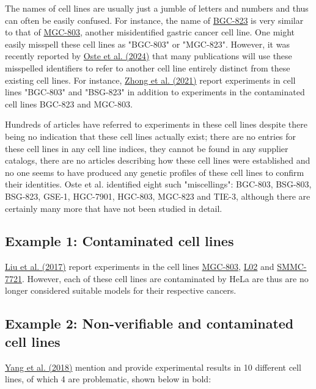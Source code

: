 \documentclass[letterpaper, 12pt]{article}
\begin{document}
The names of cell lines are usually just a jumble of letters and numbers and thus can often be easily confused. For instance, the name of \href{https://www.cellosaurus.org/CVCL_3360}{BGC-823} is very similar to that of \href{https://www.cellosaurus.org/CVCL_5334}{MGC-803}, another misidentified gastric cancer cell line. One might easily misspell these cell lines as "BGC-803" or "MGC-823". However, it was recently reported by \href{https://doi.org/10.1002/ijc.34995}{Oste et al. (2024)} that many publications will use these misspelled identifiers to refer to another cell line entirely distinct from these existing cell lines. For instance, \href{https://doi.org/10.1002/jgm.3330}{Zhong et al. (2021)} report experiments in cell lines "BGC-803" and "BSG-823" in addition to experiments in the contaminated cell lines BGC-823 and MGC-803.

Hundreds of articles have referred to experiments in these cell lines despite there being no indication that these cell lines actually exist; there are no entries for these cell lines in any cell line indices, they cannot be found in any supplier catalogs, there are no articles describing how these cell lines were established and no one seems to have produced any genetic profiles of these cell lines to confirm their identities. Oste et al. identified eight such "miscellings": BGC-803, BSG-803, BSG-823, GSE-1, HGC-7901, HGC-803, MGC-823 and TIE-3, although there are certainly many more that have not been studied in detail.

\subsection*{Example 1: Contaminated cell lines}

\href{https://doi.org/10.1016/j.yexcr.2017.09.005}{Liu et al. (2017)} report experiments in the cell lines \href{https://www.cellosaurus.org/CVCL_5334}{MGC-803}, \href{https://www.cellosaurus.org/CVCL_6926}{L02} and \href{https://www.cellosaurus.org/CVCL_0534}{SMMC-7721}. However, each of these cell lines are contaminated by HeLa are thus are no longer considered suitable models for their respective cancers.

\subsection*{Example 2: Non-verifiable and contaminated cell lines}

\href{https://doi.org/10.1186/s12943-018-0874-1}{Yang et al. (2018)} mention and provide experimental results in 10 different cell lines, of which 4 are problematic, shown below in bold:
\end{document}

